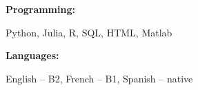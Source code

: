 \documentclass[10pt]{developercv} %
\begin{document}
\vspace{-10pt}

\begin{minipage}[t]{0.2\textwidth}
	\textbf{Programming:}
\end{minipage}
\hfill
\begin{minipage}[t]{0.78\textwidth}
Python, Julia, R, SQL, HTML, Matlab
\end{minipage}
\vspace{4mm}

\begin{minipage}[t]{0.2\textwidth}
	\textbf{Languages:}
\end{minipage}
\hfill
\begin{minipage}[t]{0.78\textwidth}
English -- B2, French -- B1, Spanish -- native
\end{minipage}
\end{document}
